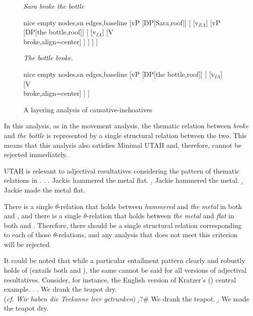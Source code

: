 \begin{figure}[h]
	\centering
	\begin{minipage}[t]{0.45\textwidth}
		\textit{Sara broke the bottle}\\
		\begin{forest}
		  nice empty nodes,sn edges,baseline
		  [vP
		    [DP[Sara,roof]]
		    [
		      [v$_{EA}$]
		      [vP
			[DP[the bottle,roof]]
			[
			  [v$_{IA}$]
			  [V\\broke,align=center]
			]
		      ]
		    ]
		  ]
		\end{forest}	
	\end{minipage}
	\begin{minipage}[t]{0.45\textwidth}
		\textit{The bottle broke.}\\
		\begin{forest}
		  nice empty nodes,sn edges,baseline
		  [vP
		    [DP[the bottle,roof]]
		    [
		      [v$_{IA}$]
		      [V\\broke,align=center]
		    ]
		  ]
		\end{forest}
	\end{minipage}
	\caption{A layering analysis of causative-inchoatives}
	\label{fig:layering}
\end{figure}
In this analysis, as in the movement analysis, the thematic relation between \textit{broke} and \textit{the bottle} is represented by a single structural relation between the two.
This means that this analysis also satisfies Minimal UTAH and, therefore, cannot be rejected immediately.

UTAH is relevant to adjectival resultatives considering the pattern of thematic relations in \Next.
\ex.\label{ex:UTAHmetal}
\a.\label{ex:UTAHmetalRes} Jackie hammered the metal flat.
\b.\label{ex:UTAHmetalhammer} Jackie hammered the metal.
\b.\label{ex:UTAHmetalmetal} Jackie made the metal flat.

There is a single $\theta$-relation that holds between \textit{hammered} and \textit{the metal} in both \Last[a] and \Last[b], and there is a single $\theta$-relation that holds between \textit{the metal} and \textit{flat} in  both \Last[a] and \Last[c]. 
Therefore, there should be a single structural relation corresponding to each of those $\theta$-relations, and any analysis that does not meet this criterion will be rejected.

It could be noted that while a particular entailment pattern clearly and robustly holds of \Last (\Last[a] entails both \Last[b] and \Last[c]), the same cannot be said for all versions of adjectival resultatives.
Consider, for instance, \Next the English version of Kratzer's (\citeyear{kratzer2004building}) central example.
\ex.\label{ex:UTAHteapot}
\a.\label{ex:UTAHteapotRes} We drank the teapot dry.\\
(\textit{cf.} \textit{Wir haben die Teekanne leer getrunken})
\b.?\# \label{ex:UTAHteapotdrank} We drank the teapot.
\b. \label{ex:UTAHteapotmade} We made the teapot dry. 

